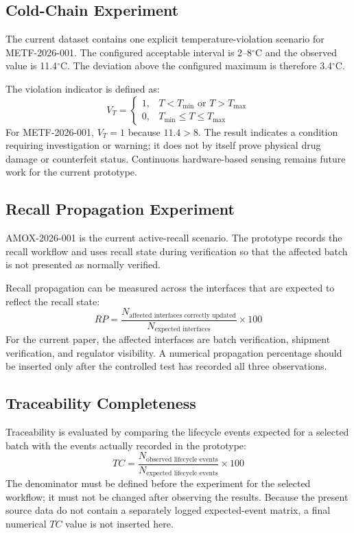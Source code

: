 \documentclass[11pt,a4paper]{article}
\begin{document}
\subsection{Cold-Chain Experiment}
The current dataset contains one explicit temperature-violation scenario for METF-2026-001. The configured acceptable interval is 2--8$^\circ$C and the observed value is 11.4$^\circ$C. The deviation above the configured maximum is therefore 3.4$^\circ$C.

The violation indicator is defined as:
\begin{equation}
V_T = \begin{cases} 1, & T < T_{\min} \text{ or } T > T_{\max} \\ 0, & T_{\min} \le T \le T_{\max} \end{cases}
\end{equation}
For METF-2026-001, $V_T = 1$ because $11.4 > 8$. The result indicates a condition requiring investigation or warning; it does not by itself prove physical drug damage or counterfeit status. Continuous hardware-based sensing remains future work for the current prototype.

\subsection{Recall Propagation Experiment}
AMOX-2026-001 is the current active-recall scenario. The prototype records the recall workflow and uses recall state during verification so that the affected batch is not presented as normally verified.

Recall propagation can be measured across the interfaces that are expected to reflect the recall state:
\begin{equation}
RP = \frac{N_{\text{affected interfaces correctly updated}}}{N_{\text{expected interfaces}}} \times 100
\end{equation}
For the current paper, the affected interfaces are batch verification, shipment verification, and regulator visibility. A numerical propagation percentage should be inserted only after the controlled test has recorded all three observations.

\subsection{Traceability Completeness}
Traceability is evaluated by comparing the lifecycle events expected for a selected batch with the events actually recorded in the prototype:
\begin{equation}
TC = \frac{N_{\text{observed lifecycle events}}}{N_{\text{expected lifecycle events}}} \times 100
\end{equation}
The denominator must be defined before the experiment for the selected workflow; it must not be changed after observing the results. Because the present source data do not contain a separately logged expected-event matrix, a final numerical $TC$ value is not inserted here.
\end{document}
